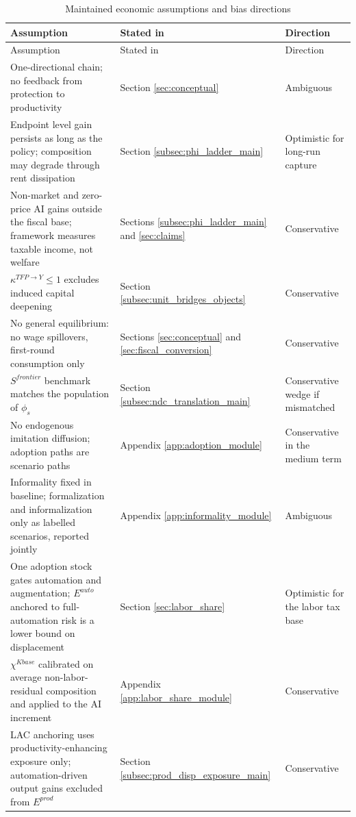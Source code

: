 \documentclass[11pt,a4paper]{article}
\begin{document}
\begin{longtable}{p{}p{}p{}}
\caption{Maintained economic assumptions and bias directions}\label{tab:maintained_assumptions_bias}\\
\toprule
Assumption & Stated in & Direction \\
\midrule
\endfirsthead
\toprule
Assumption & Stated in & Direction \\
\midrule
\endhead
One-directional chain; no feedback from protection to productivity & Section \ref{sec:conceptual} & Ambiguous \\
Endpoint level gain persists as long as the policy; composition may degrade through rent dissipation & Section \ref{subsec:phi_ladder_main} & Optimistic for long-run capture \\
Non-market and zero-price AI gains outside the fiscal base; framework measures taxable income, not welfare & Sections \ref{subsec:phi_ladder_main} and \ref{sec:claims} & Conservative \\
\(\kappa^{TFP\to Y}\leq1\) excludes induced capital deepening & Section \ref{subsec:unit_bridges_objects} & Conservative \\
No general equilibrium: no wage spillovers, first-round consumption only & Sections \ref{sec:conceptual} and \ref{sec:fiscal_conversion} & Conservative \\
\(S^{frontier}\) benchmark matches the population of \(\phi_s\) & Section \ref{subsec:ndc_translation_main} & Conservative wedge if mismatched \\
No endogenous imitation diffusion; adoption paths are scenario paths & Appendix \ref{app:adoption_module} & Conservative in the medium term \\
Informality fixed in baseline; formalization and informalization only as labelled scenarios, reported jointly & Appendix \ref{app:informality_module} & Ambiguous \\
One adoption stock gates automation and augmentation; \(E^{auto}\) anchored to full-automation risk is a lower bound on displacement & Section \ref{sec:labor_share} & Optimistic for the labor tax base \\
\(\chi^{Kbase}\) calibrated on average non-labor-residual composition and applied to the AI increment & Appendix \ref{app:labor_share_module} & Conservative \\
LAC anchoring uses productivity-enhancing exposure only; automation-driven output gains excluded from \(E^{prod}\) & Section \ref{subsec:prod_disp_exposure_main} & Conservative \\

\end{longtable}
\end{document}
